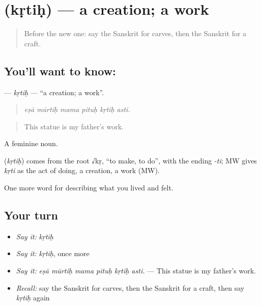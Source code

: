 \section[\texorpdfstring{\sk{कृतिः} (kṛtiḥ)}{कृतिः (kṛtiḥ)}]{ (kṛtiḥ) — a creation; a work}

\label{lesson:SA-C519-krtih}



\begin{quote}
Before the new one: say the Sanskrit for carves, then the Sanskrit for a craft.
\end{quote}

\subsection*{You'll want to know: }
\textbf{} — \emph{kṛtiḥ} — \textquotedblleft{}a creation; a work\textquotedblright{}.

\begin{quote}
     
\end{quote}

\begin{quote}
\emph{eṣā mūrtiḥ mama pituḥ kṛtiḥ asti.}
\end{quote}

\begin{quote}
This statue is my father's work.
\end{quote}

A feminine noun.

\begin{cousinweb}
\textbf{} (\emph{kṛtiḥ}) comes from the root √kṛ, \textquotedblleft{}to make, to do\textquotedblright{}, with the ending \emph{-ti}; MW gives \emph{kṛti} as the act of doing, a creation, a work (MW).
\end{cousinweb}

\begin{grammarlens}[title={What you've built}]
One more word for describing what you lived and felt.
\end{grammarlens}

\subsection*{Your turn}
\begin{itemize}
\raggedright
  \item \emph{Say it:} \emph{kṛtiḥ}
  \item \emph{Say it:} \emph{kṛtiḥ}, once more
  \item \emph{Say it:} \emph{eṣā mūrtiḥ mama pituḥ kṛtiḥ asti.} — This statue is my father's work.
  \item \emph{Recall:} say the Sanskrit for carves, then the Sanskrit for a craft, then say \emph{kṛtiḥ} again
\end{itemize}

